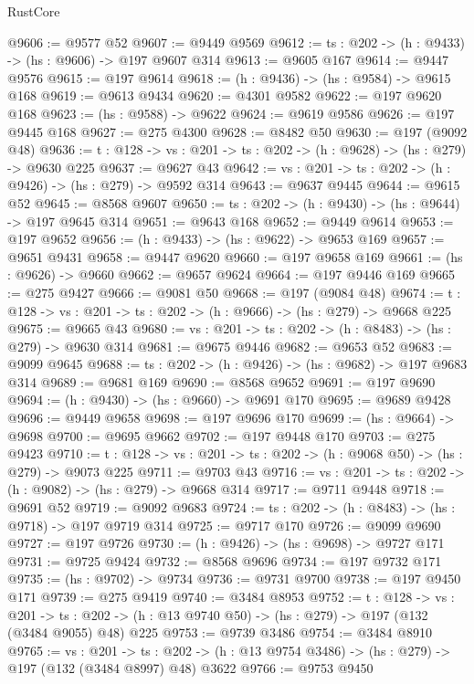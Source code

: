 \begin{lexlean}{RustCore}
\begin{coremodule}
@9606 := @9577 @52
@9607 := @9449 @9569
@9612 := {ts : @202} -> (h : @9433) -> (hs : @9606) -> @197 @9607 @314
@9613 := @9605 @167
@9614 := @9447 @9576
@9615 := @197 @9614
@9618 := (h : @9436) -> (hs : @9584) -> @9615 @168
@9619 := @9613 @9434
@9620 := @4301 @9582
@9622 := @197 @9620 @168
@9623 := (hs : @9588) -> @9622
@9624 := @9619 @9586
@9626 := @197 @9445 @168
@9627 := @275 @4300
@9628 := @8482 @50
@9630 := @197 (@9092 @48)
@9636 := {t : @128} -> {vs : @201} -> {ts : @202} -> (h : @9628) -> (hs : @279) -> @9630 @225
@9637 := @9627 @43
@9642 := {vs : @201} -> {ts : @202} -> (h : @9426) -> (hs : @279) -> @9592 @314
@9643 := @9637 @9445
@9644 := @9615 @52
@9645 := @8568 @9607
@9650 := {ts : @202} -> (h : @9430) -> (hs : @9644) -> @197 @9645 @314
@9651 := @9643 @168
@9652 := @9449 @9614
@9653 := @197 @9652
@9656 := (h : @9433) -> (hs : @9622) -> @9653 @169
@9657 := @9651 @9431
@9658 := @9447 @9620
@9660 := @197 @9658 @169
@9661 := (hs : @9626) -> @9660
@9662 := @9657 @9624
@9664 := @197 @9446 @169
@9665 := @275 @9427
@9666 := @9081 @50
@9668 := @197 (@9084 @48)
@9674 := {t : @128} -> {vs : @201} -> {ts : @202} -> (h : @9666) -> (hs : @279) -> @9668 @225
@9675 := @9665 @43
@9680 := {vs : @201} -> {ts : @202} -> (h : @8483) -> (hs : @279) -> @9630 @314
@9681 := @9675 @9446
@9682 := @9653 @52
@9683 := @9099 @9645
@9688 := {ts : @202} -> (h : @9426) -> (hs : @9682) -> @197 @9683 @314
@9689 := @9681 @169
@9690 := @8568 @9652
@9691 := @197 @9690
@9694 := (h : @9430) -> (hs : @9660) -> @9691 @170
@9695 := @9689 @9428
@9696 := @9449 @9658
@9698 := @197 @9696 @170
@9699 := (hs : @9664) -> @9698
@9700 := @9695 @9662
@9702 := @197 @9448 @170
@9703 := @275 @9423
@9710 := {t : @128} -> {vs : @201} -> {ts : @202} -> (h : @9068 @50) -> (hs : @279) -> @9073 @225
@9711 := @9703 @43
@9716 := {vs : @201} -> {ts : @202} -> (h : @9082) -> (hs : @279) -> @9668 @314
@9717 := @9711 @9448
@9718 := @9691 @52
@9719 := @9092 @9683
@9724 := {ts : @202} -> (h : @8483) -> (hs : @9718) -> @197 @9719 @314
@9725 := @9717 @170
@9726 := @9099 @9690
@9727 := @197 @9726
@9730 := (h : @9426) -> (hs : @9698) -> @9727 @171
@9731 := @9725 @9424
@9732 := @8568 @9696
@9734 := @197 @9732 @171
@9735 := (hs : @9702) -> @9734
@9736 := @9731 @9700
@9738 := @197 @9450 @171
@9739 := @275 @9419
@9740 := @3484 @8953
@9752 := {t : @128} ->
  {vs : @201} ->
  {ts : @202} -> (h : @13 @9740 @50) -> (hs : @279) -> @197 (@132 (@3484 @9055) @48) @225
@9753 := @9739 @3486
@9754 := @3484 @8910
@9765 := {vs : @201} ->
  {ts : @202} -> (h : @13 @9754 @3486) -> (hs : @279) -> @197 (@132 (@3484 @8997) @48) @3622
@9766 := @9753 @9450

\end{coremodule}
\end{lexlean}
